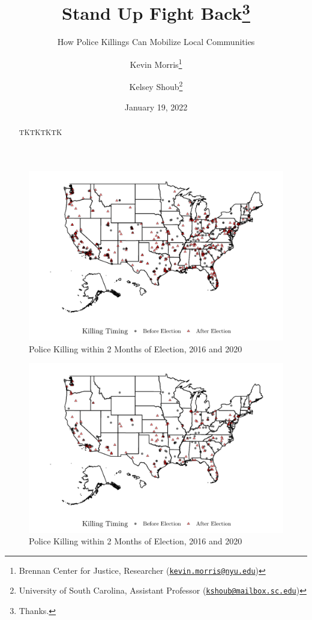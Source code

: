 \documentclass[
  12pt,
]{article}
\title{Stand Up Fight Back\thanks{Thanks.}}
\subtitle{How Police Killings Can Mobilize Local Communities}
\author{Kevin Morris\footnote{Brennan Center for Justice, Researcher (\href{mailto:kevin.morris@nyu.edu}{\nolinkurl{kevin.morris@nyu.edu}})} \and Kelsey Shoub\footnote{University of South Carolina, Assistant Professor (\href{mailto:kshoub@mailbox.sc.edu}{\nolinkurl{kshoub@mailbox.sc.edu}})}}
\date{January 19, 2022}
\begin{document}
\maketitle
\begin{abstract}
TKTKTKTK
\end{abstract}

\pagebreak
\doublespacing


\begin{figure}[h]

{\centering \includegraphics{shoot_to_files/figure-latex/map-1} 

}

\caption{\label{fig:map}Police Killing within 2 Months of Election, 2016 and 2020}\label{fig:map}
\end{figure}

\begin{figure}[h]

{\centering \includegraphics{shoot_to_files/figure-latex/map-16-1} 

}

\caption{\label{fig:map}Police Killing within 2 Months of Election, 2016 and 2020}\label{fig:map-16}
\end{figure}
\end{document}
